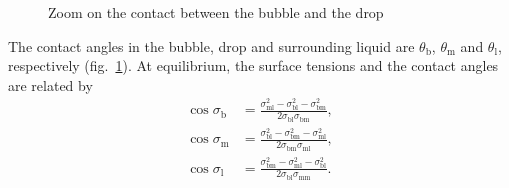 \documentclass{article}
\begin{document}
\begin{figure}
\begin{center}
    \end{center}
    \caption{Zoom on the contact between the bubble and the drop}\label{fig:two}
\end{figure}

The contact angles in the bubble, drop and surrounding liquid are
$\theta_\text{b}$, $\theta_\text{m}$ and $\theta_\text{l}$, respectively
(fig.~\ref{fig:two}).
At equilibrium, the surface tensions and the contact angles are related by
\begin{align}
    \cos{\sigma_\text{b}} &= \frac
    {\sigma_\text{ml}^2 - \sigma_\text{bl}^2 - \sigma_\text{bm}^2}
    {2\sigma_\text{bl}\sigma_\text{bm}}
    ,\\
    \cos{\sigma_\text{m}} &= \frac
    {\sigma_\text{bl}^2 - \sigma_\text{bm}^2 - \sigma_\text{ml}^2}
    {2\sigma_\text{bm}\sigma_\text{ml}}
    ,\\
    \cos{\sigma_\text{l}} &= \frac
    {\sigma_\text{bm}^2-\sigma_\text{ml}^2 - \sigma_\text{bl}^2}
    {2\sigma_\text{bl}\sigma_\text{mm}}
    .
\end{align}
\end{document}
